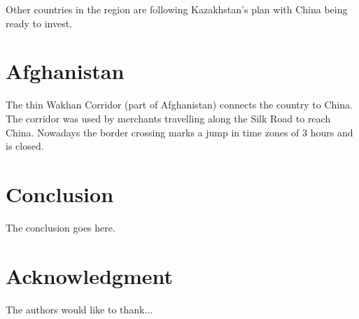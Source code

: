\documentclass[conference]{IEEEtran}
\begin{document}
	Other countries in the region are following Kazakhstan's plan with China being ready to invest.
	
	\section{Afghanistan}
	The thin Wakhan Corridor (part of Afghanistan) connects the country to China. The corridor was used by merchants travelling along the Silk Road to reach China. Nowadays the border crossing marks a jump in time zones of 3 hours and is closed.
	
	\section{Conclusion}
	The conclusion goes here.
	
	\section*{Acknowledgment}
	The authors would like to thank...
	
	
	
\end{document}
